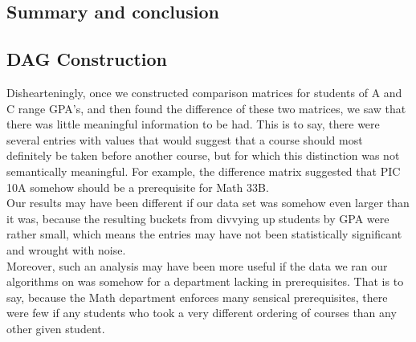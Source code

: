 \documentclass[10pt]{siamltex}
\begin{document}
\begin{pagewiselinenumbers}
\section{Summary and conclusion}  \label{sec:conclusion}
\subsection{DAG Construction}
Dishearteningly, once we constructed comparison matrices for students of A and C range GPA's, and then found the difference of these two matrices, we saw that there was little meaningful information to be had. This is to say, there were several entries with values that would suggest that a course should most definitely be taken before another course, but for which this distinction was not semantically meaningful. For example, the difference matrix suggested that PIC 10A somehow should be a prerequisite for Math 33B.\\

Our results may have been different if our data set was somehow even larger than it was, because the resulting buckets from divvying up students by GPA were rather small, which means the entries may have not been statistically significant and wrought with noise.\\

Moreover, such an analysis may have been more useful if the data we ran our algorithms on was somehow for a department lacking in prerequisites. That is to say, because the Math department enforces many sensical prerequisites, there were few if any students who took a very different ordering of courses than any other given student.




\end{pagewiselinenumbers}
\end{document}
